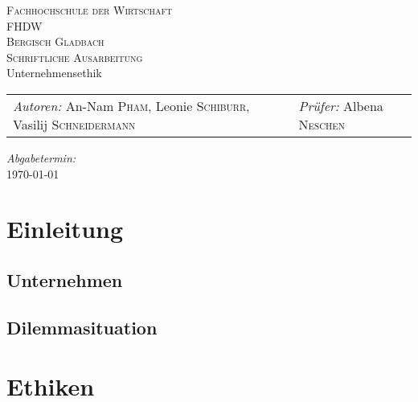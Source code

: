 \documentclass[a4paper, fontsize=12pt, parskip=full, toc=bibliographynumbered]{scrreprt}
\begin{document}
\newcommand{\headerrule}{\tabucline -}
\newcommand{\abbildung}[2]{\begin{figure}\centering
    \fbox{\texttt{[image: \#1]}}\caption{#2}
    \label{fig:#1}\end{figure}}

\author{}
\begin{titlepage}
  \begin{center}
    \textsc{\large Fachhochschule der Wirtschaft\\FHDW}\\[1em]
    \textsc{\large Bergisch Gladbach}\\[2em]
    \textsc{Schriftliche Ausarbeitung}\\[6em]
    {\LARGE Unternehmensethik}\\[25em]
    \begin{tabu} to 0.8\textwidth {X[l] X[r]}
      \emph{Autoren:}\linebreak
      An-Nam \textsc{Pham},\linebreak
      Leonie \textsc{Schiburr},\linebreak
      Vasilij \textsc{Schneidermann}
      &
      \emph{Prüfer:}\linebreak
      Albena \textsc{Neschen}
    \end{tabu}
    \vfill
    \emph{Abgabetermin:}\\
    \today
  \end{center}
\end{titlepage}

\tableofcontents
\listoffigures
\listoftables
\clearpage
{}
\setcounter{page}{1}

\chapter{Einleitung}

\section{Unternehmen}

\section{Dilemmasituation}

\chapter{Ethiken}
\end{document}
